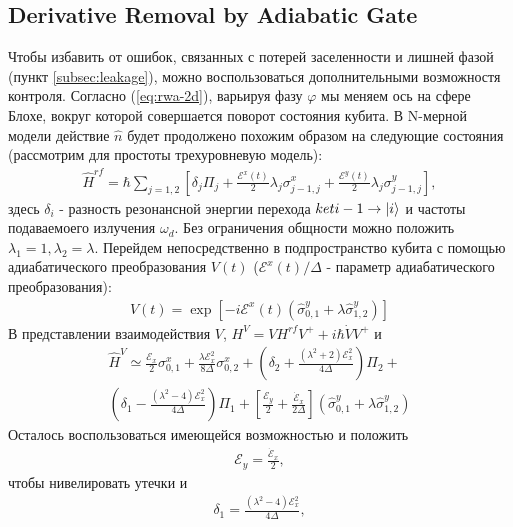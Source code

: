 \documentclass[12pt, twoside]{report}
\DeclarePairedDelimiter\ket{\lvert}{\rangle}
\numberwithin{equation}{section}
\numberwithin{figure}{section}
\begin{document}
\subsection{Derivative Removal by Adiabatic Gate} \label{subsec:DRAG}
Чтобы избавить от ошибок, связанных с потерей заселенности и лишней фазой (пункт \ref{subsec:leakage}), можно воспользоваться дополнительными возможностя контроля. Согласно (\ref{eq:rwa-2d}), варьируя фазу $\varphi$ мы меняем ось на сфере Блохе, вокруг которой совершается поворот состояния кубита. В N-мерной модели действие $\hat n$ будет продолжено похожим образом на следующие состояния \cite{Lucero2010} (рассмотрим для простоты трехуровневую модель):
\begin{gather}
\hat{H}^{rf} = \hbar \sum_{j=1,2} \left[\delta_j \Pi_j  + \frac{\mathcal{E}^x(t)}{2}\lambda_j\sigma^x_{j-1,j} + \frac{\mathcal{E}^y(t)}{2}\lambda_j\sigma^y_{j-1,j} \right],
\label{drag-ham-3d}
\end{gather}  
здесь $\delta_i$ - разность резонансной энергии перехода $ket{i-1} \rightarrow \ket{i}$ и частоты подаваемоего излучения $\omega_d$. Без ограничения общности можно положить $\lambda_1 = 1, \lambda_2 = \lambda$. Перейдем непосредственно в подпространство кубита с помощью адиабатического преобразования $V(t)$ ($\mathcal{E}^x(t)/\Delta$ - параметр адиабатического преобразования):
\begin{gather*}
V(t) = \exp \left[ -i \mathcal{E}^x(t) \left( \hat{\sigma}^y_{0,1} + \lambda \hat{\sigma}^y_{1,2}\right) \right]
\end{gather*}
В представлении взаимодействия $V$, $H^V = V H^{rf} V^+ + i \hbar \dot{V} V^+$ и 
\begin{gather*}
\hat{H}^V \simeq \frac{\mathcal{E}_x}{2}\sigma^x_{0,1} + \frac{\lambda \mathcal{E}_x^2}{ 8 \Delta}\sigma^x_{0,2}  + \left( \delta_2 + \frac{\left(\lambda^2 + 2 \right) \mathcal{E}^2_x}{4 \Delta} \right) \Pi_2 +\\  \left( \delta_1 - \frac{\left(\lambda^2 -4 \right)\mathcal{E}^2_x}{4 \Delta}\right) \Pi_1 + \left[ \frac{\mathcal{E}_y}{2} + \frac{\dot{\mathcal{E}}_x}{2 \Delta} \right] \left(\hat{\sigma}^y_{0,1} + \lambda \hat{\sigma}^y_{1,2}\right)
\end{gather*}
Осталось воспользоваться имеющейся возможностью и положить 
\begin{gather*}
\mathcal{E}_y = \frac{\dot{\mathcal{E}}_x}{2},
\end{gather*}
чтобы нивелировать утечки и 
\begin{gather*}
\delta_1 = \frac{\left(\lambda^2 -4 \right)\mathcal{E}^2_x}{4 \Delta},
\end{gather*} 
\end{document}
